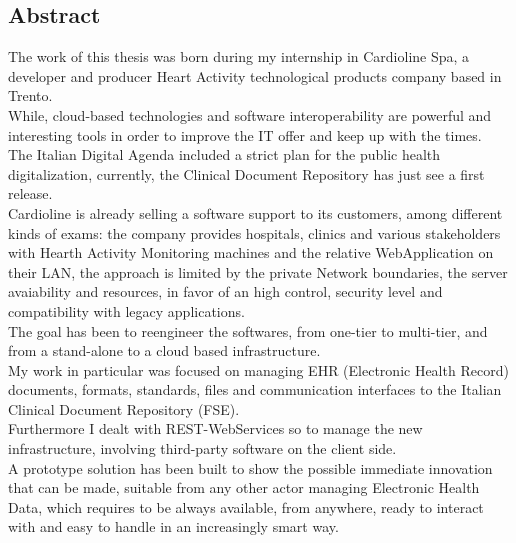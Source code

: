 \vspace*{\fill}
\begin{center}
    {
    \chapter*{Abstract} %
    \label{abstract}

    The work of this thesis was born during my internship in Cardioline Spa, a developer and producer Heart Activity technological products company based in Trento.\\While, cloud-based technologies and software interoperability are powerful and interesting tools in order to improve the IT offer and keep up with the times.\\The Italian Digital Agenda included a strict plan for the public health digitalization, currently, the Clinical Document Repository has just see a first release.\\Cardioline is already selling a software support to its customers, among different kinds of exams: the company provides hospitals, clinics and various stakeholders with Hearth Activity Monitoring machines and the relative WebApplication on their LAN, the approach is limited by the private Network boundaries, the server avaiability and resources, in favor of an high control, security level and compatibility with legacy applications.\\The goal has been to reengineer the softwares, from one-tier to multi-tier, and from a stand-alone to a cloud based infrastructure.\\My work in particular was focused on managing EHR (Electronic Health Record) documents, formats, standards, files and communication interfaces to the Italian Clinical Document Repository (FSE).\\Furthermore I dealt with REST-WebServices so to manage the new infrastructure, involving third-party software on the client side.\\A prototype solution has been built to show the possible immediate innovation that can be made, suitable from any other actor managing Electronic Health Data, which requires to be always available, from anywhere, ready to interact with and easy to handle in an increasingly smart way.
    }
\end{center}
\vspace*{\fill}